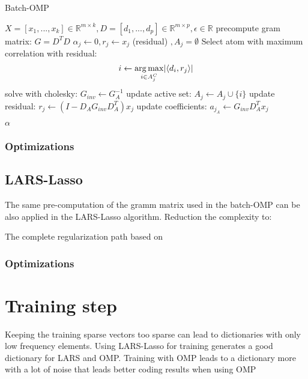 \begin{algorithm}
\caption{Batch-OMP}
\label{alg:batchOMP}
\begin{algorithmic}[1]
\REQUIRE $X =[x_1,...,x_k]  \in \mathbb{R}^{m \times k}, D  =[d_1,...,d_p]  \in \mathbb{R}^{m\times p}, \epsilon \in \mathbb{R}$
\STATE precompute gram matrix: $G=D^TD$
\STATE $\alpha_j \gets 0, r_j \gets x_j $ (residual) $, A_j=\emptyset$
\STATE Select atom with maximum correlation with residual: 
\begin{equation*}
i \gets \operatorname*{arg\,max}_{i \in A_j^C} \lvert \left<d_i,r_j\right> \rvert
\end{equation*}
\STATE solve with cholesky: $G_{inv} \gets G_A^{-1}$
\STATE update active set: $A_j \gets A_j \cup \{i\} $
\STATE update residual: $r_j \gets \left(I-D_AG_{inv}D_A^T \right)x_j$
\STATE update coefficients: $a_{j_A} \gets G_{inv} D_A^T x_j $

\ENDFOR 
\ENDFOR 

\RETURN $\alpha$
\end{algorithmic}
\end{algorithm}

\subsubsection*{Optimizations}


\subsection{LARS-Lasso}
The same pre-computation of the gramm matrix used in the batch-OMP can be also applied in the LARS-Lasso algorithm.
Reduction the complexity to: 

The complete regularization path based on \cite{Efron2004}
\subsubsection*{Optimizations}


\section{Training step}
Keeping the training sparse vectors too sparse can lead to dictionaries with only low frequency elements.
Using LARS-Lasso for training generates a good dictionary for LARS and OMP. 
Training with OMP leads to a dictionary more with a lot of noise 
that leads better coding results when using OMP 

